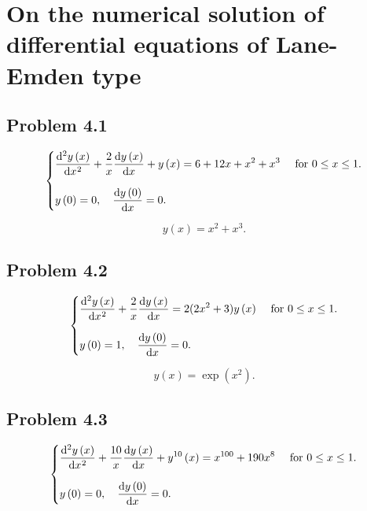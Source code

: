 \documentclass{scrartcl}
\begin{document}
\section{On the numerical solution of differential equations of Lane-Emden type}

\subsection*{Problem 4.1}

\begin{equation}
	\begin{cases}\displaystyle
		\diff[2]{y\left(x\right)}{x}+
		\frac{2}{x}
		\diff{y\left(x\right)}{x}+
		y\left(x\right)=
		6 + 12 x+ x^{2} + x^{3}
		 & \text { for }0 \leq x \leq 1. \\[0.5cm]
		\displaystyle
		y
		\left(0\right)=
		0,\quad
		\diff{y\left(0\right)}{x}=
		0.
		 &
	\end{cases}
\end{equation}

\begin{equation*}
	\boxed{y\left(x\right)=x^{2}+x^{3}.}
\end{equation*}

\subsection*{Problem 4.2}

\begin{equation}
	\begin{cases}\displaystyle
		\diff[2]{y\left(x\right)}{x}+
		\frac{2}{x}
		\diff{y\left(x\right)}{x} =
		2 (2x^{2} + 3 )y\left(x\right)
		 & \text { for }0 \leq x \leq 1. \\[0.5cm]
		\displaystyle
		y
		\left(0\right)=
		1,\quad
		\diff{y\left(0\right)}{x}=
		0.
		 &
	\end{cases}
\end{equation}

\begin{equation*}
	\boxed{y\left(x\right)=\exp\left(x^{2}\right).}
\end{equation*}

\subsection*{Problem 4.3}

\begin{equation}
	\begin{cases}\displaystyle
		\diff[2]{y\left(x\right)}{x}+
		\frac{10}{x}
		\diff{y\left(x\right)}{x} +
		y^{10}\left(x\right) =
		x^{100} + 190x^{8}
		 & \text { for }0 \leq x \leq 1. \\[0.5cm]
		\displaystyle
		y
		\left(0\right)=
		0,\quad
		\diff{y\left(0\right)}{x}=
		0.
		 &
	\end{cases}
\end{equation}
\end{document}
